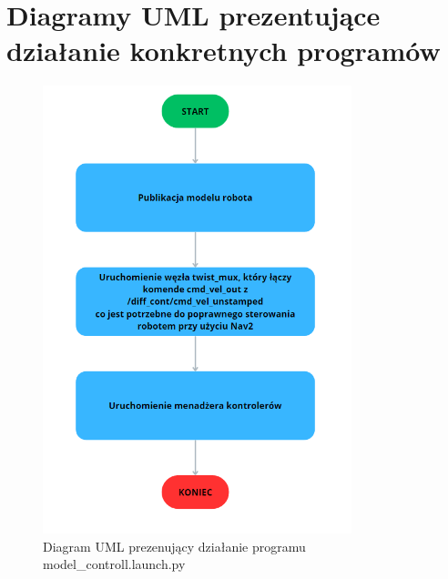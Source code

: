 \documentclass[a4paper,twoside,12pt]{book}
\begin{document}
\section{Diagramy UML prezentujące działanie konkretnych programów}
\begin{figure}[!hb]
	\centering
	\includegraphics[width=0.8\textwidth]{images/uml-model.png}
	\caption{Diagram UML prezenujący działanie programu model\_controll.launch.py}
	\label{fig:diagram-model}
\end{figure}
\end{document}
